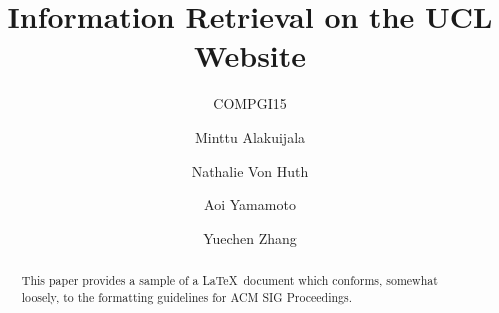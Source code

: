 \documentclass[sigconf]{acmart}
\begin{document}
\title{Information Retrieval on the UCL Website}
\subtitle{COMPGI15}


\author{Minttu Alakuijala}
\affiliation{\institution{}}

\author{Nathalie Von Huth}
\affiliation{\institution{}}

\author{Aoi Yamamoto}
\affiliation{\institution{}}

\author{Yuechen Zhang}
\affiliation{\institution{}}



\begin{abstract}
This paper provides a sample of a \LaTeX\ document which conforms,
somewhat loosely, to the formatting guidelines for
ACM SIG Proceedings.
\end{abstract}

\maketitle




 
\end{document}
